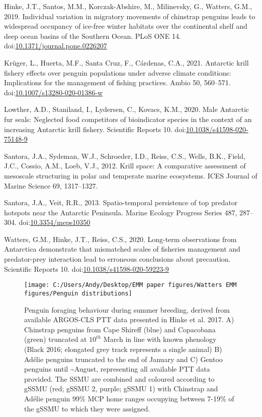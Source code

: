 \documentclass[]{elsarticle} %
\begin{document}
\leavevmode\hypertarget{ref-Hinke2019}{}%
Hinke, J.T., Santos, M.M., Korczak-Abshire, M., Milinevsky, G., Watters,
G.M., 2019. Individual variation in migratory movements of chinstrap
penguins leads to widespread occupancy of ice-free winter habitats over
the continental shelf and deep ocean basins of the Southern Ocean. PLoS
ONE 14.
doi:\href{https://doi.org/10.1371/journal.pone.0226207}{10.1371/journal.pone.0226207}

\leavevmode\hypertarget{ref-Kruger2021}{}%
Krüger, L., Huerta, M.F., Santa Cruz, F., Cárdenas, C.A., 2021.
Antarctic krill fishery effects over penguin populations under adverse
climate conditions: Implications for the management of fishing
practices. Ambio 50, 560--571.
doi:\href{https://doi.org/10.1007/s13280-020-01386-w}{10.1007/s13280-020-01386-w}

\leavevmode\hypertarget{ref-Lowther2020}{}%
Lowther, A.D., Staniland, I., Lydersen, C., Kovacs, K.M., 2020. Male
Antarctic fur seals: Neglected food competitors of bioindicator species
in the context of an increasing Antarctic krill fishery. Scientific
Reports 10.
doi:\href{https://doi.org/10.1038/s41598-020-75148-9}{10.1038/s41598-020-75148-9}

\leavevmode\hypertarget{ref-santoraKrillSpaceComparative2012}{}%
Santora, J.A., Sydeman, W.J., Schroeder, I.D., Reiss, C.S., Wells, B.K.,
Field, J.C., Cossio, A.M., Loeb, V.J., 2012. Krill space: A comparative
assessment of mesoscale structuring in polar and temperate marine
ecosystems. ICES Journal of Marine Science 69, 1317--1327.

\leavevmode\hypertarget{ref-Santora2013}{}%
Santora, J.A., Veit, R.R., 2013. Spatio-temporal persistence of top
predator hotspots near the Antarctic Peninsula. Marine Ecology Progress
Series 487, 287--304.
doi:\href{https://doi.org/10.3354/meps10350}{10.3354/meps10350}

\leavevmode\hypertarget{ref-Watters2020}{}%
Watters, G.M., Hinke, J.T., Reiss, C.S., 2020. Long-term observations
from Antarctica demonstrate that mismatched scales of fisheries
management and predator-prey interaction lead to erroneous conclusions
about precaution. Scientific Reports 10.
doi:\href{https://doi.org/10.1038/s41598-020-59223-9}{10.1038/s41598-020-59223-9}

\newpage

\begin{figure}
\texttt{[image: C:/Users/Andy/Desktop/EMM paper figures/Watters EMM figures/Penguin distributions]} \caption{Penguin foraging behaviour during summer breeding, derived from available ARGOS-CLS PTT data presented in Hinke et al. 2017. A) Chinstrap penguins from Cape Shireff (blue) and Copacobana (green) truncated at $10^{th}$ March in line with known phenology (Black 2016; elongated grey track represents a single animal) B) Adélie penguins truncated to the end of January and C) Gentoo penguins until \textasciitilde{}August, representing all available PTT data provided. The SSMU are combined and coloured according to gSSMU (red; gSSMU 2, purple; gSSMU 1) with Chinstrap and Adélie penguin 99\% MCP home ranges occupying between 7-19\% of the gSSMU to which they were assigned.  }\label{fig:Penguin distribution plots}
\end{figure}
\end{document}
